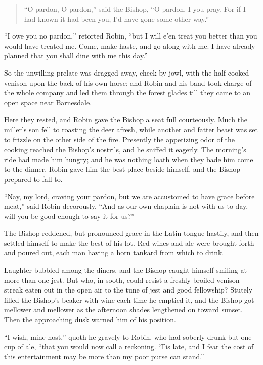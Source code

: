 \begin{quote}
“O pardon, O pardon,” said the Bishop,
“O pardon, I you pray.
For if I had known it had been you,
I’d have gone some other way.”
\end{quote}

``I owe you no pardon,'' retorted Robin, ``but I will e'en treat you
better than you would have treated me. Come, make haste, and go along
with me. I have already planned that you shall dine with me this day.''

So the unwilling prelate was dragged away, cheek by jowl, with the
half-cooked venison upon the back of his own horse; and Robin and his
band took charge of the whole company and led them through the forest
glades till they came to an open space near Barnesdale.

Here they rested, and Robin gave the Bishop a seat full courteously.
Much the miller's son fell to roasting the deer afresh, while another
and fatter beast was set to frizzle on the other side of the fire.
Presently the appetizing odor of the cooking reached the Bishop's
nostrils, and he sniffed it eagerly. The morning's ride had made him
hungry; and he was nothing loath when they bade him come to the dinner.
Robin gave him the best place beside himself, and the Bishop prepared to
fall to.

``Nay, my lord, craving your pardon, but we are accustomed to have grace
before meat,'' said Robin decorously. ``And as our own chaplain is not
with us to-day, will you be good enough to say it for us?''

The Bishop reddened, but pronounced grace in the Latin tongue hastily,
and then settled himself to make the best of his lot. Red wines and ale
were brought forth and poured out, each man having a horn tankard from
which to drink.

Laughter bubbled among the diners, and the Bishop caught himself smiling
at more than one jest. But who, in sooth, could resist a freshly broiled
venison streak eaten out in the open air to the tune of jest and good
fellowship? Stutely filled the Bishop's beaker with wine each time he
emptied it, and the Bishop got mellower and mellower as the afternoon
shades lengthened on toward sunset. Then the approaching dusk warned him
of his position.

``I wish, mine host,'' quoth he gravely to Robin, who had soberly drunk
but one cup of ale, ``that you would now call a reckoning. `Tis late,
and I fear the cost of this entertainment may be more than my poor purse
can stand.''

